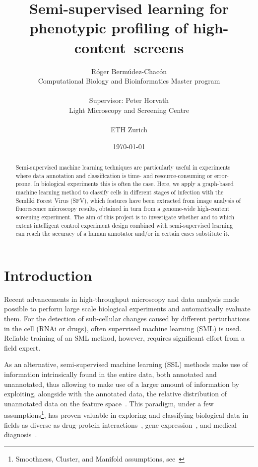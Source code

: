\documentclass[oneside, a4paper, draft]{memoir} %
\title{
	Semi-supervised learning for phenotypic profiling of \mbox{high-content screens\ifdraft{ (DRAFT)}{\thanks{This project was held as a Lab Rotation in Computer Science,
			as required by the Master program in Computational Biology and Bioinformatics - ETH Z\"urich}}}}
\author{
	\ifdraft{Roger Bermudez-Chacon\\Supervisor: Peter Horvath}
	{Róger Bermúdez-Chacón\\\small Computational Biology and Bioinformatics Master program\\\\
			Supervisor: Peter Horvath\\\small Light Microscopy and Screening Centre}\\\\ETH Zurich
}
\date{\today}
\begin{document}
\maketitle
\begin{abstract}
Semi-supervised machine learning techniques are particularly useful in experiments where data annotation and classification
is time- and resource-consuming or error-prone. In biological experiments this is often the case.
Here, we apply a graph-based machine learning method to classify cells in different stages of infection with the Semliki Forest Virus (SFV),
which features have been extracted from image analysis of fluorescence microscopy results, obtained in turn from a genome-wide
high-content screening experiment.
The aim of this project is to investigate whether and to which extent intelligent control experiment design 
combined with semi-supervised learning can reach the accuracy of a human annotator and/or in certain 
cases substitute it.

\end{abstract}
\setcounter{secnumdepth}{0}

\section{Introduction}
Recent advancements in high-throughput microscopy and data analysis made possible to perform large 
scale biological experiments and automatically evaluate them. For the detection of sub-cellular changes 
caused by different perturbations in the cell (RNAi or drugs), often supervised machine learning (SML) 
is used. Reliable training of an SML method, however, requires significant effort from a field expert.

As an alternative, semi-supervised machine learning (SSL) methods make use of information intrinsically found in the 
entire data, both annotated and unannotated, thus allowing to make use of a larger amount of information
by exploiting, alongside with the annotated data, the relative distribution of unannotated data on the feature space~\cite{chapelle2006semi}.
This paradigm, under a few assumptions\footnote{Smoothness,
Cluster, and Manifold assumptions, see~\cite[p.~4-6]{chapelle2006semi}},
has proven valuable in exploring and classifying biological data in fields as diverse as drug-protein
interactions~\cite{zheng2010semi}, gene expression~\cite{costa2007semi}, and medical diagnosis~\cite{bair2004semi}.
\end{document}
